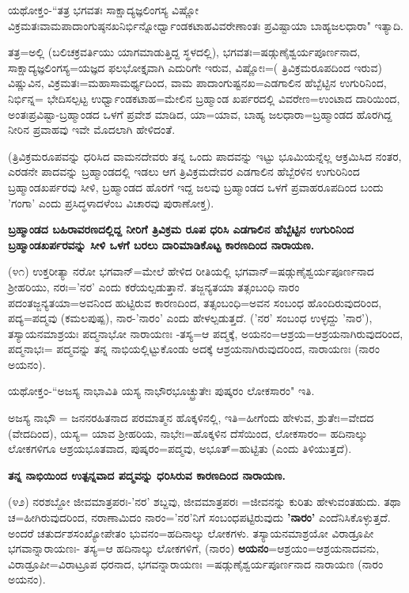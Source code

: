 ಯಥೋಕ್ತಂ-``ತತ್ರ ಭಗವತಃ ಸಾಕ್ಷಾದ್ಯಜ್ಞಲಿಂಗಸ್ಯ ವಿಷ್ಣೋ ವಿಕ್ರಮತಃವಾಮಪಾದಾಂಗುಷ್ಠನಖನಿರ್ಭಿನ್ನೋರ್ಧ್ವಾಂಡಕಟಾಹವಿವರೇಣಾಂತಃ ಪ್ರವಿಷ್ಟಾಯಾ ಬಾಹ್ಯಜಲಧಾರಾ" ಇತ್ಯಾದಿ.

ತತ್ರ=ಅಲ್ಲಿ (ಬಲಿಚಕ್ರವರ್ತಿಯು ಯಾಗಮಾಡುತ್ತಿದ್ದ ಸ್ಥಳದಲ್ಲಿ), ಭಗವತಃ=ಷಡ್ಗುಣೈಶ್ವರ್ಯಪೂರ್ಣನಾದ, ಸಾಕ್ಷಾದ್ಯಜ್ಞಲಿಂಗಸ್ಯ=ಯಜ್ಞದ ಫಲಭೋಕ್ತೃವಾಗಿ ಎದುರಿಗೇ ಇರುವ, ವಿಷ್ಣೋಃ=( ತ್ರಿವಿಕ್ರಮರೂಪದಿಂದ ಇರುವ) ವಿಷ್ಣುವಿನ, ವಿಕ್ರಮತಃ=ಮಹಾಸಾಮರ್ಥ್ಯದಿಂದ, ವಾಮ ಪಾದಾಂಗುಷ್ಟನಖ=ಎಡಗಾಲಿನ ಹೆಬ್ಬೆಟ್ಟಿನ ಉಗುರಿನಿಂದ, ನಿರ್ಭಿನ್ನ= ಭೇದಿಸಲ್ಪಟ್ಟ ಉರ್ಧ್ವಾಂಡಕಟಾಹ=ಮೇಲಿನ ಬ್ರಹ್ಮಾಂಡ ಖರ್ಪರದಲ್ಲಿ ವಿವರೇಣ=ಉಂಟಾದ ದಾರಿಯಿಂದ, ಅಂತಃಪ್ರವಿಷ್ಟಾ-ಬ್ರಹ್ಮಾಂಡದ ಒಳಗೆ ಪ್ರವೇಶ ಮಾಡಿದ, ಯಾ=ಯಾವ, ಬಾಹ್ಯ ಜಲಧಾರಾ=ಬ್ರಹ್ಮಾಂಡದ ಹೊರಗಿದ್ದ ನೀರಿನ ಪ್ರವಾಹವು ಇವೇ ಮೊದಲಾಗಿ ಹೇಳಿದಂತೆ.

(ತ್ರಿವಿಕ್ರಮರೂಪವನ್ನು ಧರಿಸಿದ ವಾಮನದೇವರು ತನ್ನ ಒಂದು ಪಾದವನ್ನು ಇಟ್ಟು ಭೂಮಿಯನ್ನೆಲ್ಲ ಆಕ್ರಮಿಸಿದ ನಂತರ, ಎರಡನೇ ಪಾದವನ್ನು ಬ್ರಹ್ಮಾಂಡದಲ್ಲಿ ಇಡಲು ಆಗ ತ್ರಿವಿಕ್ರಮದೇವರ ಎಡಗಾಲಿನ ಹೆಬ್ಬೆರಳಿನ ಉಗುರಿನಿಂದ ಬ್ರಹ್ಮಾಂಡಖರ್ಪರವು ಸೀಳಿ, ಬ್ರಹ್ಮಾಂಡದ ಹೊರಗೆ ಇದ್ದ ಜಲವು ಬ್ರಹ್ಮಾಂಡದ ಒಳಗೆ ಪ್ರವಾಹರೂಪದಿಂದ ಬಂದು 'ಗಂಗಾ' ಎಂದು ಪ್ರಸಿದ್ಧಳಾದಳೆಂಬ ವಿಚಾರವು ಪುರಾಣೋಕ್ತ).

\begin{center}
\textbf{ಬ್ರಹ್ಮಾಂಡದ ಬಹಿರಾವರಣದಲ್ಲಿದ್ದ ನೀರಿಗೆ ತ್ರಿವಿಕ್ರಮ ರೂಪ ಧರಿಸಿ ಎಡಗಾಲಿನ ಹೆಬ್ಬೆಟ್ಟಿನ ಉಗುರಿನಿಂದ ಬ್ರಹ್ಮಾಂಡಖರ್ಪರವನ್ನು ಸೀಳಿ ಒಳಗೆ ಬರಲು ದಾರಿಮಾಡಿಕೊಟ್ಟ ಕಾರಣದಿಂದ ನಾರಾಯಣ.}
\end{center}

(೪೧) ಉಕ್ತರೀತ್ಯಾ ನರೋ ಭಗವಾನ್=ಮೇಲೆ ಹೇಳಿದ ರೀತಿಯಲ್ಲಿ ಭಗವಾನ್=ಷಡ್ಗುಣೈಶ್ವರ್ಯಪೂರ್ಣನಾದ ಶ‍್ರೀಹರಿಯು, ನರಃ='ನರ' ಎಂದು ಕರೆಯಲ್ಪಡುತ್ತಾನೆ. ತಜ್ಜನ್ಯತಯಾ ತತ್ಸಂಬಂಧಿ ನಾರಂ ಪದಂತಜ್ಜನ್ಯತಯಾ=ಅವನಿಂದ ಹುಟ್ಟಿರುವ ಕಾರಣದಿಂದ, ತತ್ಸಂಬಂಧಿ=ಅವನ ಸಂಬಂಧ ಹೊಂದಿರುವುದರಿಂದ, ಪದ್ಯ=ಪದ್ಮವು (ಕಮಲಪುಷ್ಪ), ನಾರ-'ನಾರಂ' ಎಂದು ಹೇಳಲ್ಪಡುತ್ತದೆ. ('ನರ' ಸಂಬಂಧ ಉಳ್ಳದ್ದು 'ನಾರ'), ತಸ್ಯಾಯನಮಾಶ್ರಯಃ ಪದ್ಮನಾಭೋ ನಾರಾಯಣಃ -ತಸ್ಯ=ಆ ಪದ್ಮಕ್ಕೆ, ಅಯನಂ=ಆಶ್ರಯ=ಆಶ್ರಯನಾಗಿರುವುದರಿಂದ, ಪದ್ಮನಾಭಃ= ಪದ್ಮವನ್ನು ತನ್ನ ನಾಭಿಯಲ್ಲಿಟ್ಟುಕೊಂಡು ಅದಕ್ಕೆ ಆಶ್ರಯನಾಗಿರುವುದರಿಂದ, ನಾರಾಯಣಃ (ನಾರಂ ಅಯನಂ).

ಯಥೋಕ್ತಂ-``ಅಜಸ್ಯ ನಾಭಾವಿತಿ ಯಸ್ಯ ನಾಭೌರಭೂಚ್ಛ್ರುತೇಃ ಪುಷ್ಕರಂ ಲೋಕಸಾರಂ" ಇತಿ.

ಅಜಸ್ಯ ನಾಭೌ = ಜನನರಹಿತನಾದ ಪರಮಾತ್ಮನ ಹೊಕ್ಕಳಿನಲ್ಲಿ, ಇತಿ=ಹೀಗೆಂದು ಹೇಳುವ, ಶ್ರುತೇಃ=ವೇದದ (ವೇದದಿಂದ), ಯಸ್ಯ= ಯಾವ ಶ‍್ರೀಹರಿಯ, ನಾಭೇಃ=ಹೊಕ್ಕಳಿನ ದೆಸೆಯಿಂದ, ಲೋಕಸಾರಂ= ಹದಿನಾಲ್ಕು ಲೋಕಗಳಿಗೂ ಆಶ್ರಯಭೂತವಾದ, ಪುಷ್ಕರಂ=ಪದ್ಮವು, ಅಭೂತ್=ಹುಟ್ಟಿತು (ಎಂದು ತಿಳಿಯುತ್ತದೆ).

\begin{center}
\textbf{ತನ್ನ ನಾಭಿಯಿಂದ ಉತ್ಪನ್ನವಾದ ಪದ್ಮವನ್ನು ಧರಿಸಿರುವ ಕಾರಣದಿಂದ ನಾರಾಯಣ.}
\end{center}

(೪೨) ನರಶಬ್ದೋ ಜೀವಮಾತ್ರಪರಃ-'ನರ' ಶಬ್ದವು, ಜೀವಮಾತ್ರಪರಃ =ಜೀವನನ್ನು ಕುರಿತು ಹೇಳುವಂತಹುದು. ತಥಾ ಚ=ಹೀಗಿರುವುದರಿಂದ, ನರಾಣಾಮಿದಂ ನಾರಂ='ನರ'ನಿಗೆ ಸಂಬಂಧಪಟ್ಟಿರುವುದು \textbf{'ನಾರಂ'} ಎಂದೆನಿಸಿಕೊಳ್ಳುತ್ತದೆ. ಅಂದರೆ ಚತುರ್ದಶಸಂಖ್ಯೋಪೇತಂ ಭುವನಂ=ಹದಿನಾಲ್ಕು ಲೋಕಗಳು. ತಸ್ಯಾಯನಮಾಶ್ರಯೋ ವಿರಾಡ್ರೂಪೀ ಭಗವಾನ್ನಾರಾಯಣಃ- ತಸ್ಯ=ಆ ಹದಿನಾಲ್ಕು ಲೋಕಗಳಿಗೆ, (ನಾರಂ) \textbf{ಅಯನಂ}=ಆಶ್ರಯಂ=ಆಶ್ರಯನಾದವನು, ವಿರಾಡ್ರೂಪೀ=ವಿರಾಟ್ರೂಪ ಧರನಾದ, ಭಗವನ್ನಾರಾಯಣಃ =ಷಡ್ಗುಣೈಶ್ವರ್ಯಪೂರ್ಣನಾದ ನಾರಾಯಣ (ನಾರಂ ಅಯನಂ).

